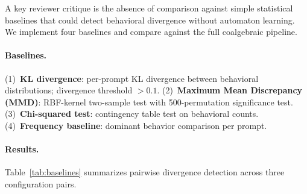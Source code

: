 \documentclass[11pt]{article}
\begin{document}
A key reviewer critique is the absence of comparison against simple
statistical baselines that could detect behavioral divergence without
automaton learning.  We implement four baselines and compare against
the full coalgebraic pipeline.

\paragraph{Baselines.}
(1)~\textbf{KL divergence}: per-prompt KL divergence between behavioral
distributions; divergence threshold $>0.1$.
(2)~\textbf{Maximum Mean Discrepancy (MMD)}: RBF-kernel two-sample test
with 500-permutation significance test.
(3)~\textbf{Chi-squared test}: contingency table test on behavioral counts.
(4)~\textbf{Frequency baseline}: dominant behavior comparison per prompt.

\paragraph{Results.}
Table~\ref{tab:baselines} summarizes pairwise divergence detection
across three configuration pairs.
\end{document}
